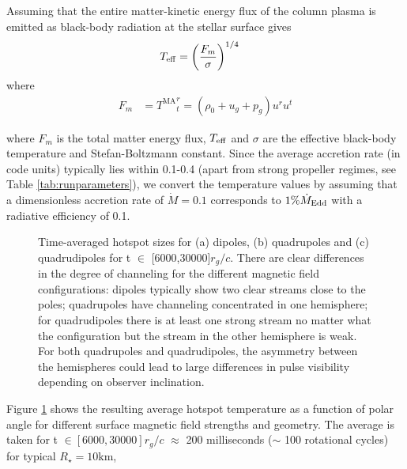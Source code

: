 \documentclass[fleqn,usenatbib]{mnras}
\newcommand{\rstar}{\ensuremath{R_{\star}}}
\begin{document}
Assuming that the entire matter-kinetic energy flux of the column plasma is emitted as black-body radiation at the stellar surface gives 
\begin{align}
    T_{\rm eff} &= \bigg(\frac{F_{m}}{\sigma}\bigg)^{1/4}
    \end{align}
    where
    \begin{align}
    F_{m} &= {T^{\text{MA}}}^r_t = (\rho_0 + u_g + p_g)u^r u^t 
\end{align}

where $F_{m}$ is the total matter energy flux, $T_{\rm eff}$ and $\sigma$ are the effective black-body temperature and Stefan-Boltzmann constant. Since the average accretion rate (in code units) typically lies within 0.1-0.4 (apart from strong propeller regimes, see Table \ref{tab:runparameters}), we convert the temperature values by assuming that a dimensionless accretion rate of $\dot{M}=0.1$ corresponds to $1\%\dot{M}_{\rm Edd}$ with a radiative efficiency of 0.1.
\begin{figure}
 \centering
{}%
\caption{Time-averaged hotspot sizes for (a) dipoles, (b) quadrupoles and (c) quadrudipoles for t $\in$ [6000,30000]$r_g/c$. There are clear differences in the degree of channeling for the different magnetic field configurations:  dipoles typically show two clear streams close to the poles; quadrupoles have channeling concentrated in one hemisphere; for quadrudipoles there is at least one strong stream no matter what the configuration but the stream in the other hemisphere is weak. For both quadrupoles and quadrudipoles, the asymmetry between the hemispheres could lead to large differences in pulse visibility depending on observer inclination.}%
\label{fig:hotspots}
\end{figure}

Figure \ref{fig:hotspots} shows the resulting average hotspot temperature as a function of polar angle for different surface magnetic field strengths and geometry.  The average is taken for t $\in [6000,30000] r_g/c$ $\approx$ 200 milliseconds ($\sim$ 100 rotational cycles) for typical $\rstar = 10$km,
\end{document}
